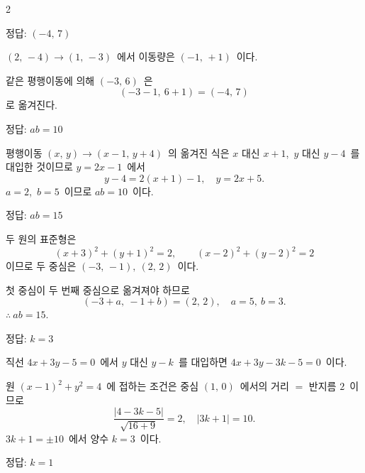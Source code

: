 \documentclass[10pt,fleqn]{article}
\begin{document}
\begin{multicols*}{2}

\begin{dmanswerbox}
정답: $(-4,\, 7)$
\end{dmanswerbox}

$(2,\, -4) \to (1,\, -3)$\ 에서 이동량은 $(-1,\, +1)$\ 이다.

같은 평행이동에 의해 $(-3,\, 6)$\ 은
\[ (-3 - 1,\ 6 + 1) = (-4,\, 7) \]
로 옮겨진다.

\begin{dmanswerbox}
정답: $ab=10$
\end{dmanswerbox}

평행이동 $(x,\, y) \to (x - 1,\, y + 4)$\ 의 옮겨진 식은 $x$ 대신 $x + 1$,\ $y$ 대신 $y - 4$\ 를 대입한 것이므로 $y = 2x - 1$\ 에서
\[ y - 4 = 2(x + 1) - 1,\quad y = 2x + 5. \]
$a = 2$,\ $b = 5$\ 이므로 $ab = 10$\ 이다.

\begin{dmanswerbox}
정답: $ab=15$
\end{dmanswerbox}

두 원의 표준형은
\[ (x + 3)^2 + (y + 1)^2 = 2,\qquad (x - 2)^2 + (y - 2)^2 = 2 \]
이므로 두 중심은 $(-3,\, -1),\ (2,\, 2)$\ 이다.

첫 중심이 두 번째 중심으로 옮겨져야 하므로
\[ (-3 + a,\ -1 + b) = (2,\, 2),\quad a = 5,\ b = 3. \]
$\therefore\ ab = 15$.

\begin{dmanswerbox}
정답: $k=3$
\end{dmanswerbox}

직선 $4x + 3y - 5 = 0$\ 에서 $y$ 대신 $y - k$\ 를 대입하면 $4x + 3y - 3k - 5 = 0$\ 이다.

원 $(x - 1)^2 + y^2 = 4$\ 에 접하는 조건은 중심 $(1,\, 0)$\ 에서의 거리 $=$ 반지름 $2$\ 이므로
\[ \dfrac{|4 - 3k - 5|}{\sqrt{16 + 9}} = 2,\quad |3k + 1| = 10. \]
$3k + 1 = \pm 10$\ 에서 양수 $k = 3$\ 이다.

\begin{dmanswerbox}
정답: $k=1$
\end{dmanswerbox}


\end{multicols*}
\end{document}
